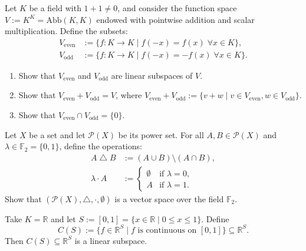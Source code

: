 \begin{exercise}
\label{exc:even_odd_function_subspaces}
Let $K$ be a field with $1 + 1 \ne 0$, and consider the function space $V := K^K = \mathrm{Abb}(K, K)$ endowed with pointwise addition and scalar multiplication. Define the subsets:
\begin{align*}
V_{\mathrm{even}} &:= \{f \colon K \to K \mid f(-x) = f(x) \;\forall x \in K\}, \\
V_{\mathrm{odd}} &:= \{f \colon K \to K \mid f(-x) = -f(x) \;\forall x \in K\}.
\end{align*}
\begin{enumerate}
    \item Show that $V_{\mathrm{even}}$ and $V_{\mathrm{odd}}$ are linear subspaces of $V$.
    \item Show that $V_{\mathrm{even}} + V_{\mathrm{odd}} = V$, where $V_{\mathrm{even}} + V_{\mathrm{odd}} := \{v + w \mid v \in V_{\mathrm{even}}, w \in V_{\mathrm{odd}}\}$.
    \item Show that $V_{\mathrm{even}} \cap V_{\mathrm{odd}} = \{0\}$.
\end{enumerate}
\end{exercise}

\begin{exercise}
\label{exc:power_set_f2_vector_space}
Let $X$ be a set and let $\mathcal{P}(X)$ be its power set. For all $A, B \in \mathcal{P}(X)$ and $\lambda \in \mathbb{F}_2 = \{0, 1\}$, define the operations:
\begin{align*}
A \bigtriangleup B &:= (A \cup B) \setminus (A \cap B), \\
\lambda \cdot A &:= \begin{cases} \emptyset & \text{if } \lambda = 0, \\ A & \text{if } \lambda = 1. \end{cases}
\end{align*}
Show that $(\mathcal{P}(X), \bigtriangleup, \cdot, \emptyset)$ is a vector space over the field $\mathbb{F}_2$.
\end{exercise}

\begin{example}
\label{ex:continuous_subspace}
Take $K = \mathbb{R}$ and let $S := [0,1] = \{x \in \mathbb{R} \mid 0 \le x \le 1\}$. Define
\[
C(S) := \{f \in \mathbb{R}^S \mid f \text{ is continuous on } [0,1]\} \subseteq \mathbb{R}^S.
\]
Then $C(S) \subseteq \mathbb{R}^S$ is a linear subspace.
\end{example}

